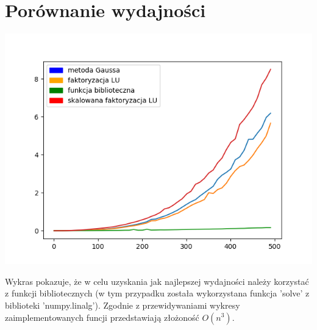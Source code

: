\documentclass[11pt, a4paper]{article}
\begin{document}
\section{Porównanie wydajności}
\begin{center}
\includegraphics[scale=0.8]{Figure_3}
\end{center}
Wykras pokazuje, że w celu uzyskania jak najlepszej wydajności należy korzystać z funkcji bibliotecznych (w tym przypadku została wykorzystana funkcja 'solve' z biblioteki 'numpy.linalg'). Zgodnie z przewidywaniami wykresy zaimplementowanych funcji przedstawiają złożoność \begin{math} O(n^3). \end{math}

 
\end{document}
